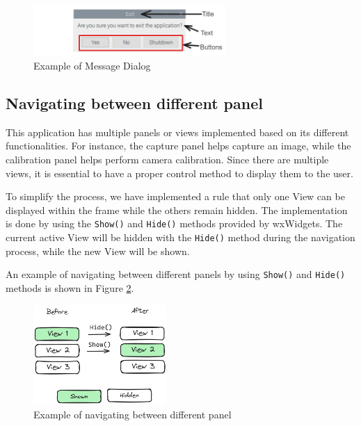\begin{figure}[!ht]
    \centering
    \includegraphics[width=0.65\textwidth]{texs/Part2/chapter4/image/dialog.png}
    \caption{Example of Message Dialog}
    \label{fig:message_dialog}
\end{figure}

\subsection{Navigating between different panel}
\label{subsec:navigating_between_different_panel}

This application has multiple panels or views implemented based on its different functionalities. For instance, the capture panel helps capture an image, while the calibration panel helps perform camera calibration. Since there are multiple views, it is essential to have a proper control method to display them to the user.

To simplify the process, we have implemented a rule that only one View can be displayed within the frame while the others remain hidden. The implementation is done by using the \texttt{Show()} and \texttt{Hide()} methods provided by wxWidgets. The current active View will be hidden with the \texttt{Hide()} method during the navigation process, while the new View will be shown.

An example of navigating between different panels by using \texttt{Show()} and \texttt{Hide()} methods is shown in Figure \ref{fig:show_panel}.

\begin{figure}[!ht]
    \centering
    \includegraphics[width=0.45\textwidth]{texs/Part2/chapter4/image/showpanel.png}
    \caption{Example of navigating between different panel}
    \label{fig:show_panel}
\end{figure}

